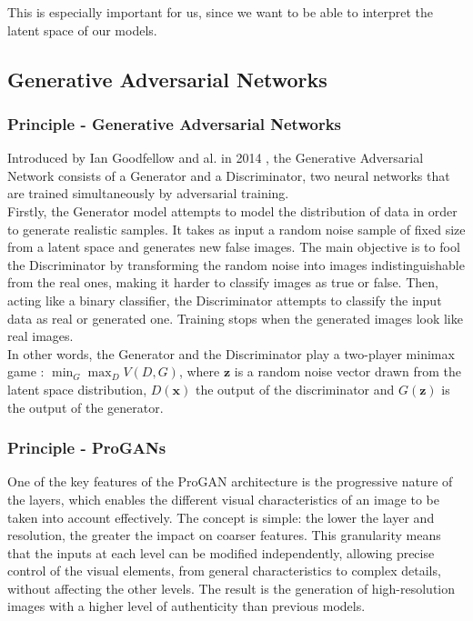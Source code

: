 \documentclass{article}
\begin{document}
This is especially important for us, since we want to be able to interpret the latent space of our models.


\subsection{Generative Adversarial Networks}

\subsubsection*{Principle - Generative Adversarial Networks}

\quad Introduced by Ian Goodfellow and al. in 2014 \cite{goodfellow2014generative}, the Generative Adversarial Network consists of a Generator and a Discriminator, two neural networks that are trained simultaneously by adversarial training. \\
Firstly, the Generator model attempts to model the distribution of data in order to generate realistic samples. 
It takes as input a random noise sample of fixed size from a latent space and generates new false images. 
The main objective is to fool the Discriminator by transforming the random noise into images indistinguishable from the real ones, making it harder to classify images as true or false. 
Then, acting like a binary classifier, the Discriminator attempts to classify the input data as real or generated one. Training stops when the generated images look like real images.\\

In other words, the Generator and the Discriminator play a two-player minimax game : $\min_G \max_D V(D, G)$, where $\mathbf{z}$ is a random noise vector drawn from the latent space distribution, $D(\mathbf{x})$ the output of the discriminator and $G(\mathbf{z})$ is the output of the generator.\\

\subsubsection*{Principle - ProGANs}
One of the key features of the ProGAN architecture is the progressive nature of the layers, which enables the different visual characteristics of an image to be taken into account effectively. 
The concept is simple: the lower the layer and resolution, the greater the impact on coarser features. 
This granularity means that the inputs at each level can be modified independently, allowing precise control of the visual elements, from general characteristics to complex details, without affecting the other levels. 
The result is the generation of high-resolution images with a higher level of authenticity than previous models.
\end{document}
